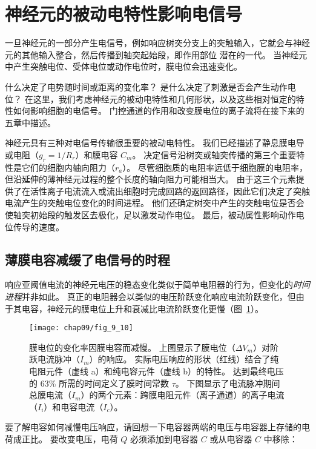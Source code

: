 \section{神经元的被动电特性影响电信号}

一旦神经元的一部分产生电信号，例如响应树突分支上的突触输入，它就会与神经元的其他输入整合，然后传播到轴突起始段，即作用部位 潜在的一代。
当神经元中产生突触电位、受体电位或动作电位时，膜电位会迅速变化。


什么决定了电势随时间或距离的变化率？
是什么决定了刺激是否会产生动作电位？
在这里，我们考虑神经元的被动电特性和几何形状，以及这些相对恒定的特性如何影响细胞的电信号。 
门控通道的作用和改变膜电位的离子流将在接下来的五章中描述。


神经元具有三种对电信号传输很重要的被动电特性。 
我们已经描述了静息膜电导或电阻（$g_r = 1 / R_r$）和膜电容 $C_m$。
决定信号沿树突或轴突传播的第三个重要特性是它们的细胞内轴向阻力（$r_a$）。 
尽管细胞质的电阻率远低于细胞膜的电阻率，但沿延伸的薄神经元过程的整个长度的轴向阻力可能相当大。
由于这三个元素提供了在活性离子电流流入或流出细胞时完成回路的返回路径，因此它们决定了突触电流产生的突触电位变化的时间进程。
他们还确定树突中产生的突触电位是否会使轴突初始段的触发区去极化，足以激发动作电位。
最后，被动属性影响动作电位传导的速度。


\subsection{薄膜电容减缓了电信号的时程}

响应亚阈值电流的神经元电压的稳态变化类似于简单电阻器的行为，但变化的\textit{时间进程}并非如此。 
真正的电阻器会以类似的电压阶跃变化响应电流阶跃变化，但由于其电容，神经元的膜电位上升和衰减比电流阶跃变化更慢（图~\ref{fig:9_10}）。


\begin{figure}[htbp]
	\centering
	\texttt{[image: chap09/fig\_9\_10]}
	\caption{膜电位的变化率因膜电容而减慢。
		上图显示了膜电位（$\Delta V_m$）对阶跃电流脉冲（$I_m$）的响应。
		实际电压响应的形状（红线）结合了纯电阻元件（虚线 a）和纯电容元件（虚线 b）的特性。
		达到最终电压的 63\% 所需的时间定义了膜时间常数 $\tau$。
		下图显示了电流脉冲期间总膜电流（$I_m$）的两个元素：跨膜电阻元件（离子通道）的离子电流（$I_i$）和电容电流（$I_c$）。}
	\label{fig:9_10}
\end{figure}


要了解电容如何减慢电压响应，请回想一下电容器两端的电压与电容器上存储的电荷成正比。 
要改变电压，电荷 $Q$ 必须添加到电容器 $C$ 或从电容器 $C$ 中移除：

